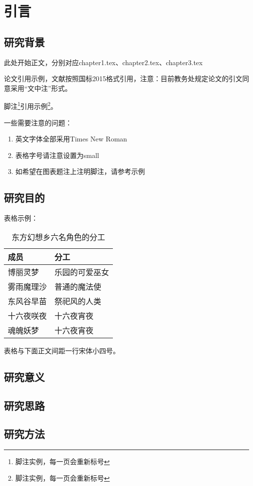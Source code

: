 \chapter{引言}

\section{研究背景}

此处开始正文，分别对应chapter1.tex、chapter2.tex、chapter3.tex

论文引用示例\cite{王宣承-1}，文献按照国标2015格式引用，注意：目前教务处规定论文的引文同意采用“文中注”形式。

脚注\footnote{脚注实例，每一页会重新标号}引用示例\footnote{脚注实例，每一页会重新标号}。

一些需要注意的问题：
\begin{enumerate}
    \item 英文字体全部采用Times New Roman
    \item 表格字号请注意设置为small
    \item 如希望在图表题注上注明脚注，请参考示例
\end{enumerate}

\section{研究目的}

表格示例：
\begin{table}[H]
    \centering
    \small
    \caption{东方幻想乡六名角色的分工}
    \begin{tabularx}{\textwidth}{X >{\centering\arraybackslash}X}
        \toprule[1.0bp]
        成员    & 分工      \\
        \midrule[0.75bp]
        博丽灵梦  & 乐园的可爱巫女 \\
        雾雨魔理沙 & 普通的魔法使  \\
        东风谷早苗 & 祭祀风的人类  \\
        十六夜咲夜 & 十六夜宵夜   \\
        魂魄妖梦  & 十六夜宵夜   \\
        \bottomrule[1.0bp]
    \end{tabularx}
    \vspace{4bp}
\end{table}

表格与下面正文间距一行宋体小四号。

\section{研究意义}

\section{研究思路}

\section{研究方法}
